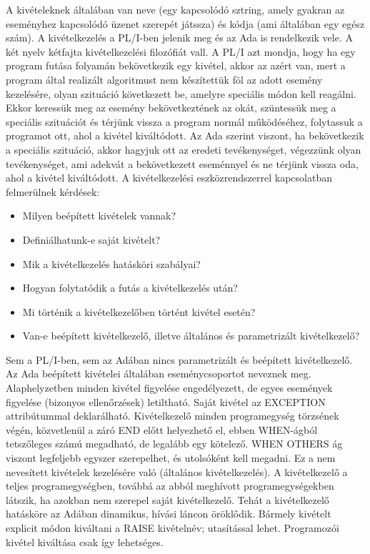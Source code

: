 A kivételeknek általában van neve (egy kapcsolódó sztring, amely gyakran az eseményhez kapcsolódó üzenet szerepét játssza) és kódja (ami általában egy egész szám). A kivételkezelés a PL/I-ben jelenik meg és az Ada is rendelkezik vele. A két nyelv kétfajta kivételkezelési filozófiát vall. A PL/I azt mondja, hogy ha egy program futása folyamán bekövetkezik egy kivétel, akkor az azért van, mert a program által realizált algoritmust nem készítettük föl az adott esemény kezelésére, olyan szituáció következett be, amelyre speciális módon kell reagálni. Ekkor keressük meg az esemény bekövetkeztének az okát, szüntessük meg a speciális szituációt és térjünk vissza a program normál működéséhez, folytassuk a programot ott, ahol a kivétel kiváltódott. Az Ada szerint viszont, ha bekövetkezik a speciális szituáció, akkor hagyjuk ott az eredeti tevékenységet, végezzünk olyan tevékenységet, ami adekvát a bekövetkezett eseménnyel és ne térjünk vissza oda, ahol a kivétel kiváltódott. A kivételkezelési eszközrendszerrel kapcsolatban felmerülnek kérdések:
\begin{itemize}[noitemsep]
	\item Milyen beépített kivételek vannak?
	\item Definiálhatunk-e saját kivételt?
	\item Mik a kivételkezelés hatásköri szabályai?
	\item Hogyan folytatódik a futás a kivételkezelés után?
	\item Mi történik a kivételkezelőben történt kivétel esetén? 
	\item Van-e beépített kivételkezelő, illetve általános és parametrizált kivételkezelő?
\end{itemize}

Sem a PL/I-ben, sem az Adában nincs parametrizált és beépített kivételkezelő. Az Ada beépített kivételei általában eseménycsoportot neveznek meg. Alaphelyzetben minden kivétel figyelése engedélyezett, de egyes események figyelése (bizonyos ellenőrzések) letiltható. Saját kivétel az EXCEPTION attribútummal deklarálható. Kivételkezelő minden programegység törzsének végén, közvetlenül a záró END előtt helyezhető el, ebben WHEN-ágból tetszőleges számú megadható, de legalább egy kötelező. WHEN OTHERS ág viszont legfeljebb egyszer szerepelhet, és utolsóként kell megadni. Ez a nem nevesített kivételek kezelésére való (általános kivételkezelés). A kivételkezelő a teljes programegységben, továbbá az abból meghívott programegységekben látszik, ha azokban nem szerepel saját kivételkezelő. Tehát a kivételkezelő hatásköre az Adában dinamikus, hívási láncon öröklődik. Bármely kivételt explicit módon kiváltani a RAISE kivételnév; utasítással lehet. Programozói kivétel kiváltása csak így lehetséges.

